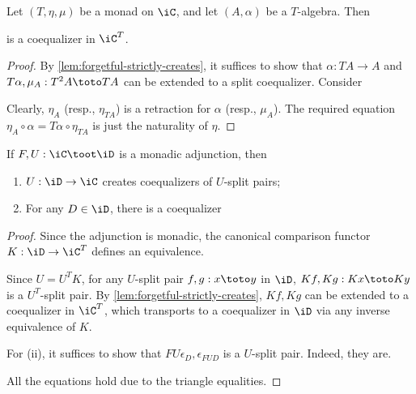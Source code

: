 \documentclass{amsart}
\begin{document}
\begin{lem}
  Let $(T,\eta,\mu)$ be a monad on $\iC$, and let $(A,\alpha)$ be a $T$-algebra.
  Then
  
  is a coequalizer in $\iC^{T}$.
\end{lem}
\begin{proof}
  By \cref{lem:forgetful-strictly-creates}, it suffices to show that $\alpha : TA \to A$ and $T\alpha,\mu_{A} : T^{2}A \toto TA$ can be extended to a split coequalizer.
  Consider
  
  Clearly, $\eta_{A}$ (resp., $\eta_{TA}$) is a retraction for $\alpha$ (resp., $\mu_{A}$).
  The required equation $\eta_{A} \circ \alpha = T\alpha \circ \eta_{TA}$ is just the naturality of $\eta$.
\end{proof}

\begin{cor}
  If $F,U : \iC \toot \iD$ is a monadic adjunction, then
  \begin{enumerate}
  \item $U : \iD \to \iC$ creates coequalizers of $U$-split pairs;
  \item For any $D \in \iD$, there is a coequalizer
    
  \end{enumerate}
\end{cor}
\begin{proof}
  Since the adjunction is monadic, the canonical comparison functor $K : \iD \to \iC^{T}$ defines an equivalence.
  
  Since $U = U^{T}K$, for any $U$-split pair $f,g : x \toto y$ in $\iD$, $Kf,Kg : Kx \toto Ky$ is a $U^{T}$-split pair.
  By \cref{lem:forgetful-strictly-creates}, $Kf,Kg$ can be extended to a coequalizer in $\iC^{T}$, which transports to a coequalizer in $\iD$ via any inverse equivalence of $K$.

  For (ii), it suffices to show that $FU\epsilon_{D}, \epsilon_{FUD}$ is a $U$-split pair.
  Indeed, they are.
  
  All the equations hold due to the triangle equalities.
\end{proof}



\end{document}
